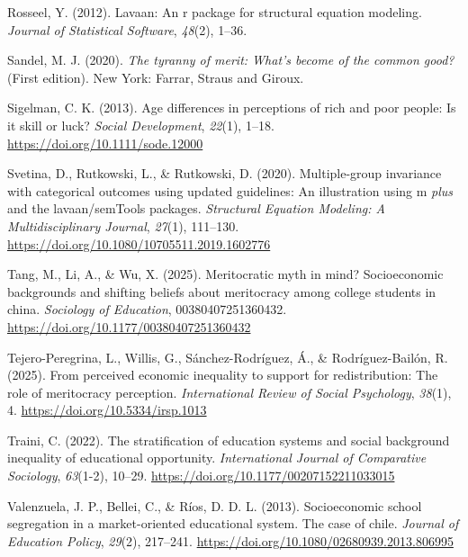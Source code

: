 \documentclass[
  11pt,
]{article}
\newlength{\cslhangindent}
\newenvironment{CSLReferences}[2] %
 {\begin{list}{}{%
  \setlength{\itemindent}{0pt}
  \setlength{\leftmargin}{0pt}
  \setlength{\parsep}{0pt}
  \ifodd #1
   \setlength{\leftmargin}{\cslhangindent}
   \setlength{\itemindent}{-1\cslhangindent}
  \fi
  \setlength{\itemsep}{#2\baselineskip}}}
 {\end{list}}
\begin{document}
\begin{CSLReferences}{1}{0}
Rosseel, Y. (2012). Lavaan: An r package for structural equation
modeling. \emph{Journal of Statistical Software}, \emph{48}(2), 1--36.

Sandel, M. J. (2020). \emph{The tyranny of merit: What's become of the
common good?} (First edition). New York: {Farrar, Straus and Giroux}.

Sigelman, C. K. (2013). Age differences in perceptions of rich and poor
people: Is it skill or luck? \emph{Social Development}, \emph{22}(1),
1--18. \url{https://doi.org/10.1111/sode.12000}

Svetina, D., Rutkowski, L., \& Rutkowski, D. (2020). Multiple-group
invariance with categorical outcomes using updated guidelines: An
illustration using m {\emph{plus}} and the lavaan/semTools packages.
\emph{Structural Equation Modeling: A Multidisciplinary Journal},
\emph{27}(1), 111--130.
\url{https://doi.org/10.1080/10705511.2019.1602776}

Tang, M., Li, A., \& Wu, X. (2025). Meritocratic myth in mind?
Socioeconomic backgrounds and shifting beliefs about meritocracy among
college students in china. \emph{Sociology of Education},
00380407251360432. \url{https://doi.org/10.1177/00380407251360432}

Tejero-Peregrina, L., Willis, G., Sánchez-Rodríguez, Á., \&
Rodríguez-Bailón, R. (2025). From perceived economic inequality to
support for redistribution: The role of meritocracy perception.
\emph{International Review of Social Psychology}, \emph{38}(1), 4.
\url{https://doi.org/10.5334/irsp.1013}

Traini, C. (2022). The stratification of education systems and social
background inequality of educational opportunity. \emph{International
Journal of Comparative Sociology}, \emph{63}(1-2), 10--29.
\url{https://doi.org/10.1177/00207152211033015}

Valenzuela, J. P., Bellei, C., \& Ríos, D. D. L. (2013). Socioeconomic
school segregation in a market-oriented educational system. The case of
chile. \emph{Journal of Education Policy}, \emph{29}(2), 217--241.
\url{https://doi.org/10.1080/02680939.2013.806995}


\end{CSLReferences}
\end{document}
